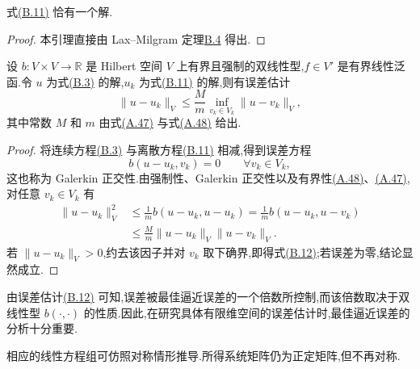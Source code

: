 \begin{lemma}[式(B.11)解的存在唯一性]\label{lem:appendix-b-11}
式\hyperref[eq:appendix-b-11]{(B.11)} 恰有一个解.
\end{lemma}
\begin{proof}
本引理直接由 Lax--Milgram 定理\hyperref[thm:appendix-b-4]{B.4} 得出.
\end{proof}

\begin{lemma}\label{lem:appendix-b-12}\label{lem:cea}
设 $b:V\times V\to\mathbb R$ 是 Hilbert 空间 $V$ 上有界且强制的双线性型,$f\in V'$ 是有界线性泛函.令 $u$ 为式\hyperref[eq:appendix-b-3]{(B.3)} 的解,$u_k$ 为式\hyperref[eq:appendix-b-11]{(B.11)} 的解,则有误差估计
\begin{equation}\label{eq:appendix-b-12}
 \|u-u_k\|_V\le\frac{M}{m}\inf_{v_k\in V_k}\|u-v_k\|_V,
\end{equation}
其中常数 $M$ 和 $m$ 由式\hyperref[eq:appendix-a-47]{(A.47)} 与式\hyperref[eq:appendix-a-48]{(A.48)} 给出.
\end{lemma}
\begin{proof}
将连续方程\hyperref[eq:appendix-b-3]{(B.3)} 与离散方程\hyperref[eq:appendix-b-11]{(B.11)} 相减,得到误差方程
\[
 b(u-u_k,v_k)=0\qquad \forall v_k\in V_k,
\]
这也称为 Galerkin 正交性.由强制性、Galerkin 正交性以及有界性\hyperref[eq:appendix-a-48]{(A.48)}、\hyperref[eq:appendix-a-47]{(A.47)},对任意 $v_k\in V_k$ 有
\[
\begin{aligned}
 \|u-u_k\|_V^2
 &\le \frac1m b(u-u_k,u-u_k)
 =\frac1m b(u-u_k,u-v_k)\\
 &\le \frac{M}{m}\|u-u_k\|_V\|u-v_k\|_V.
\end{aligned}
\]
若 $\|u-u_k\|_V>0$,约去该因子并对 $v_k$ 取下确界,即得式\hyperref[eq:appendix-b-12]{(B.12)};若误差为零,结论显然成立.
\end{proof}

\begin{note}[最佳逼近误差]\label{note:appendix-b-13}
由误差估计\hyperref[eq:appendix-b-12]{(B.12)} 可知,误差被最佳逼近误差的一个倍数所控制,而该倍数取决于双线性型 $b(\cdot,\cdot)$ 的性质.因此,在研究具体有限维空间的误差估计时,最佳逼近误差的分析十分重要.
\end{note}

\begin{note}[相应的线性方程组]\label{note:appendix-b-14}
相应的线性方程组可仿照对称情形推导.所得系统矩阵仍为正定矩阵,但不再对称.
\end{note}

